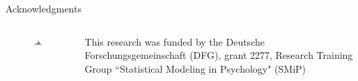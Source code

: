 \documentclass[10pt]{beamer}
\begin{document}
	\begin{frame}{Acknowledgments}
		\vspace{1cm}
		\begin{columns} 
			\begin{column}{.48\textwidth} 
				\begin{figure}[p]
					\includegraphics[width=150px]{subfiles/logo_full.eps}
				\end{figure}
			\end{column}
			\begin{column}{.48\textwidth} 
				\begin{center}
					\footnotesize{This research was funded by the Deutsche
					Forschungsgemeinschaft (DFG), grant 2277, Research Training
				Group ``Statistical Modeling in Psychology" (SMiP)}
				\end{center}
			\end{column}
		\end{columns}
	\end{frame}
\end{document}
